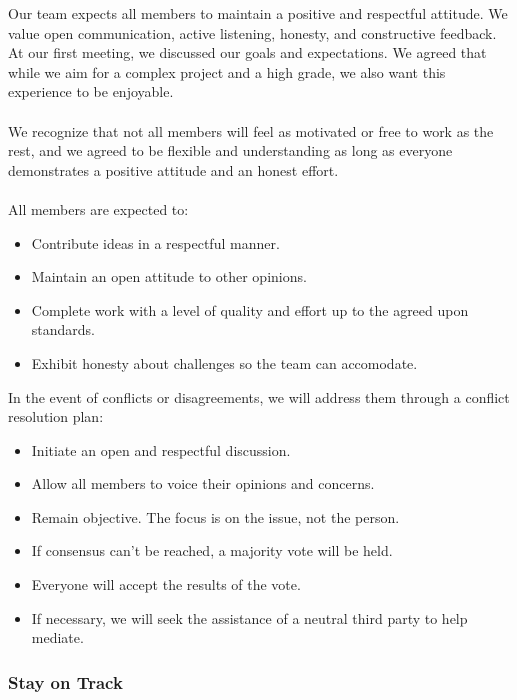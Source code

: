\documentclass{article}
\begin{document}
Our team expects all members to maintain a positive and respectful attitude. We value open communication, active listening, honesty, and constructive feedback. At our first meeting, we discussed our goals and expectations. We agreed that while we aim for a complex project and a high grade, we also want this experience to be enjoyable. \\\\ 
We recognize that not all members will feel as motivated or free to work as the rest, and we agreed to be flexible and understanding as long as everyone demonstrates a positive attitude and an honest effort. \\\\ 
All members are expected to:
\begin{itemize}
  \item Contribute ideas in a respectful manner.
  \item Maintain an open attitude to other opinions.
  \item Complete work with a level of quality and effort up to the agreed upon standards. 
  \item Exhibit honesty about challenges so the team can accomodate.
\end{itemize} 
In the event of conflicts or disagreements, we will address them through a conflict resolution plan: 
\begin{itemize}
  \item Initiate an open and respectful discussion.
  \item Allow all members to voice their opinions and concerns.
  \item Remain objective. The focus is on the issue, not the person.
  \item If consensus can't be reached, a majority vote will be held.
  \item Everyone will accept the results of the vote.
  \item If necessary, we will seek the assistance of a neutral third party to help mediate.
\end{itemize}

\subsubsection*{Stay on Track}
\end{document}
